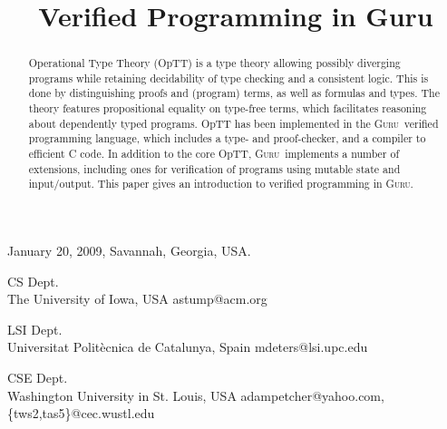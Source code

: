 \documentclass[9pt,natbib]{sigplanconf}
\newcommand{\guru}[0]{\textsc{Guru}}
\begin{document}
 {January 20, 2009, Savannah, Georgia, USA.}

\titlebanner{\ }        %
\preprintfooter{\ }   %



\title{Verified Programming in Guru}

{CS Dept.\\ The University of Iowa, USA}
{astump@acm.org}

{LSI Dept.\\ Universitat Polit\`{e}cnica de Catalunya, Spain}
{mdeters@lsi.upc.edu}

{CSE Dept.\\ Washington University in St. Louis, USA}
{adampetcher@yahoo.com,\\\{tws2,tas5\}@cec.wustl.edu}



\maketitle


\begin{abstract}
Operational Type Theory (OpTT) is a type theory allowing possibly
diverging programs while retaining decidability of type checking and a
consistent logic.  This is done by distinguishing proofs and (program)
terms, as well as formulas and types.  The theory features
propositional equality on type-free terms, which facilitates reasoning
about dependently typed programs.  OpTT has been implemented in the
\guru\ verified programming language, which includes a type- and
proof-checker, and a compiler to efficient C code.  In addition to the
core OpTT, \guru\ implements a number of extensions, including ones
for verification of programs using mutable state and input/output.
This paper gives an introduction to verified programming in \guru.
\end{abstract}
\end{document}
